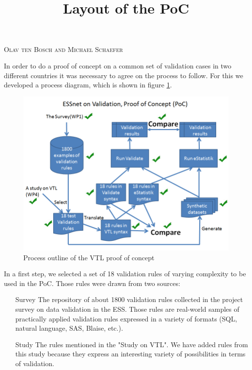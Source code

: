 \title{Layout of the PoC}
\textsc{Olav ten Bosch and Michael Schaefer}
\vspace{0.6cm}

In order to do a proof of concept on a common set of validation cases in two different countries it was necessary to agree on the process to follow. For this we developed a process diagram, which is shown in figure \ref{pocprocess}.


\begin{figure}[h!]
\begin{center}
\includegraphics[scale=0.5]{20151207ESSnetPoCProcess.PNG} 
\end{center}
\caption{Process outline of the VTL proof of concept}
\label{pocprocess}
\end{figure}

In a first step, we selected a set of 18 validation rules of varying complexity
to be used in the PoC. Those rules were drawn from two sources:

\begin{itemize}
\item[Survey]
The repository of about 1800 validation rules collected in the project survey on
data validation in the ESS. Those rules are real-world samples of practically
applied validation rules expressed in a variety of formats (SQL, natural language,
SAS, Blaise, etc.).
\item[Study]
The rules mentioned in the "Study on VTL". We have added rules from this study
because they express an interesting variety of possibilities in terms of validation.
\end{itemize}

